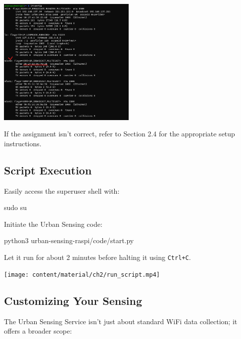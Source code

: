 \documentclass[
  letterpaper,
]{scrbook}
\newenvironment{Shaded}{\begin{snugshade}}{\end{snugshade}}
\newcommand{\ExtensionTok}[1]{\textcolor[rgb]{0.00,0.23,0.31}{#1}}
\newcommand{\FunctionTok}[1]{\textcolor[rgb]{0.28,0.35,0.67}{#1}}
\newcommand{\NormalTok}[1]{\textcolor[rgb]{0.00,0.23,0.31}{#1}}
\begin{document}
\includegraphics[width=0.5\textwidth,height=\textheight]{content/material/ch2/ifconfig_wlan_check.png}

If the assignment isn't correct, refer to Section 2.4 for the
appropriate setup instructions.

\subsection{Script Execution}\label{script-execution}

Easily access the superuser shell with:

\begin{Shaded}
\begin{Highlighting}[]
\FunctionTok{sudo}\NormalTok{ su}
\end{Highlighting}
\end{Shaded}

Initiate the Urban Sensing code:

\begin{Shaded}
\begin{Highlighting}[]
\ExtensionTok{python3}\NormalTok{ urban{-}sensing{-}raspi/code/start.py}
\end{Highlighting}
\end{Shaded}

Let it run for about 2 minutes before halting it using \texttt{Ctrl+C}.

\texttt{[image: content/material/ch2/run\_script.mp4]}

\subsection{Customizing Your Sensing}\label{customizing-your-sensing}

The Urban Sensing Service isn't just about standard WiFi data
collection; it offers a broader scope:
\end{document}
